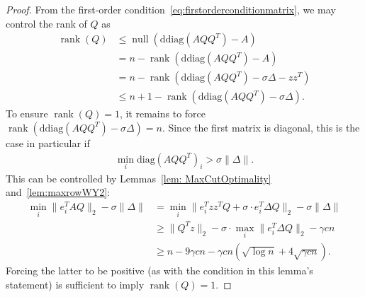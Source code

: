 \documentclass{colt2016} %
\newcommand{\transpose}{^\top\! }
\newcommand{\diag}{\mathrm{diag}}
\newcommand{\rank}{\operatorname{rank}}
\newcommand{\nulll}{\operatorname{null}}
\newcommand{\1}{\mathbf{1}}
\newcommand{\TODO}[1]{{\color{red}{[#1]}}}
\newcommand{\ddiag}{\mathrm{ddiag}}
\begin{document}
\begin{proof}
	From the first-order condition~\eqref{eq:firstorderconditionmatrix}, we may control the rank of $Q$ as
	\begin{align*}
	\rank(Q) & \leq \nulll\left(\ddiag(AQQ^T)-A\right) \\
	& = n - \rank\left(\ddiag(AQQ^T)-A\right) \\
	& = n - \rank\left(\ddiag(AQQ^T)-\sigma \Delta  - zz^T\right) \\
	& \leq n+1 - \rank\left(\ddiag(AQQ^T)-\sigma \Delta \right).
	\end{align*}
	To ensure $\rank(Q) = 1$, it remains to force $\rank(\ddiag(AQQ^T)-\sigma \Delta ) = n$. Since the first matrix is diagonal, this is the case in particular if
	\begin{align*}
	\min_i \diag(AQQ^T)_i > \sigma \|\Delta \|.
	\end{align*}
	This can be controlled by Lemmas~\ref{lem: MaxCutOptimality} and~\ref{lem:maxrowWY2}:
	\begin{align*}
	\min_i \|e_i^T AQ\|_2 - \sigma \|\Delta \| & = \min_i \|e_i^T zz^T Q + \sigma \cdot e_i^T \Delta  Q\|_2 - \sigma \|\Delta \| \\
	& \geq \|Q^Tz\|_2 - \sigma \cdot \max_i \|e_i^T \Delta Q\|_2 - \gamma c n \\
	& \geq n - 9\gamma c n - \gamma c n \left( \sqrt{\log n}  + 4\sqrt{\gamma cn}\right).
	\end{align*}
	Forcing the latter to be positive (as with the condition in this lemma's statement) is sufficient to imply $\rank(Q) = 1$.

\end{proof}
\end{document}
